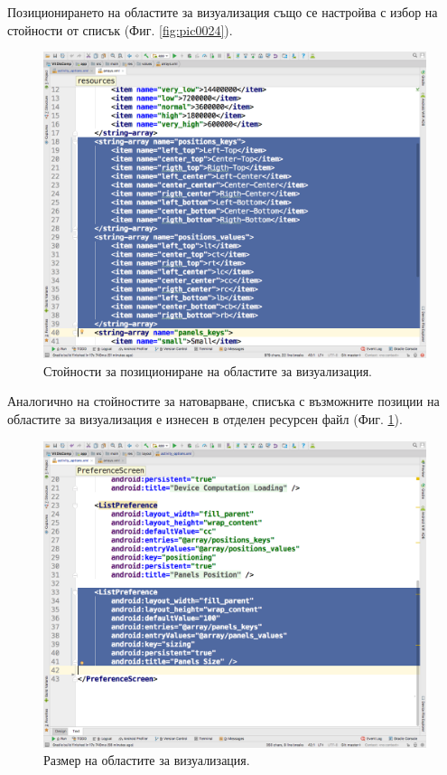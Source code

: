 \documentclass[book,14pt,oneside,openany]{memoir}
\begin{document}
Позиционирането на областите за визуализация също се настройва с избор на стойности от списък (Фиг. \ref{fig:pic0024}). 

\begin{figure}[h]
  \centering
  \includegraphics[height=0.45\pdfpageheight]{./images/pic0025.png}
  \caption{Стойности за позициониране на областите за визуализация.}
\label{fig:pic0025}
\end{figure}
\FloatBarrier

Аналогично на стойностите за натоварване, списъка с възможните позиции на областите за визуализация е изнесен в отделен ресурсен файл (Фиг. \ref{fig:pic0025}). 

\begin{figure}[h]
  \centering
  \includegraphics[height=0.45\pdfpageheight]{./images/pic0026.png}
  \caption{Размер на областите за визуализация.}
\label{fig:pic0026}
\end{figure}
\FloatBarrier
\end{document}
